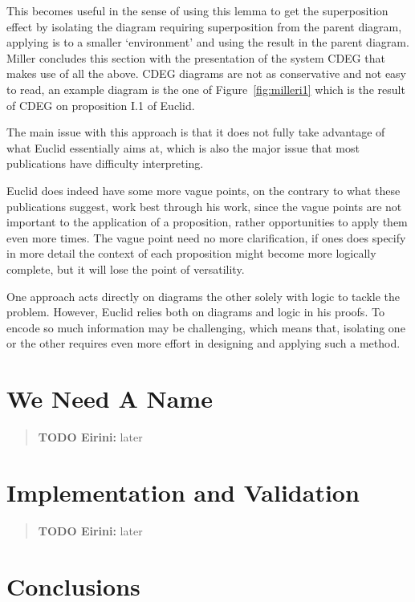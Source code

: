 \documentclass[]{interact}
\theoremstyle{plain}
\theoremstyle{definition}
\theoremstyle{remark}
\newcommand{\quotes}[1]{`#1'}
\newcommand{\comment}[2]
{
\begin{quote}
\textbf{#1:}
     #2
\end{quote}
}
\begin{document}
This becomes useful in the sense of using this lemma to get the
superposition effect by isolating the diagram requiring superposition
from the parent diagram, applying is to a smaller \quotes{environment}
and using the result in the parent diagram. Miller concludes this
section with the presentation of the system CDEG that makes use of all
the above. CDEG diagrams are not as conservative and not easy to read,
an example diagram is the one of Figure~\ref{fig:milleri1} which is
the result of CDEG on proposition I.1 of Euclid.

The main issue with this approach is that it does not fully take
advantage of what Euclid essentially aims at, which is also the major
issue that most publications have difficulty interpreting.

Euclid does indeed have some more vague points, on the contrary to
what these publications suggest, work best through his work, since the
vague points are not important to the application of a proposition,
rather opportunities to apply them even more times. The vague point
need no more clarification, if ones does specify in more detail the
context of each proposition might become more logically complete, but
it will lose the point of versatility.

One approach acts directly on diagrams \cite{Miller2001ADF} the other
solely with logic \cite{AVIGAD2009,beeson2019proof} to tackle the
problem. However, Euclid relies both on diagrams and logic in his
proofs. To encode so much information may be challenging, which means
that, isolating one or the other requires even more effort in
designing and applying such a method.


\section{We Need A Name}
\label{sec:foreground}

\comment{TODO Eirini}{later}


\section{Implementation and Validation}
\label{sec:impl}
\label{sec:eval}

\comment{TODO Eirini}{later}


\section{Conclusions}
\label{sec:conc}



\end{document}
